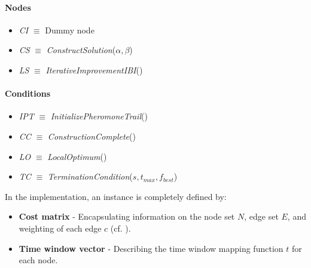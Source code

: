 \begin{homeworkProblem}
\begin{center}
\begin{minipage}{.45\textwidth}
\end{minipage}%
\hspace{1.5cm}
\begin{minipage}{.45\textwidth}
\centering
\paragraph{Nodes}
\begin{itemize}
  \item \emph{CI} $\equiv$ Dummy node
  \item \emph{CS} $\equiv$ \emph{ConstructSolution}($\alpha,\beta$)
  \item \emph{LS} $\equiv$ \emph{IterativeImprovementIBI}()
\end{itemize}
\paragraph{Conditions}
\begin{itemize}
  \item \emph{IPT} $\equiv$ \emph{InitializePheromoneTrail}()
  \item \emph{CC} $\equiv$ \emph{ConstructionComplete}()
  \item \emph{LO} $\equiv$ \emph{LocalOptimum}()
  \item \emph{TC} $\equiv$ \emph{TerminationCondition}($s,t_{max},f_{best}$)
\end{itemize}
\end{minipage}
\end{center}

\newpage
In the implementation, an instance is completely defined by:
\begin{itemize}
\item \textbf{Cost matrix} - Encapsulating information on the node set $N$, edge set $E$, and weighting of each edge $c$ (cf. ).
\item \textbf{Time window vector} - Describing the time window mapping function $t$ for each node.
\end{itemize}


\end{homeworkProblem}
